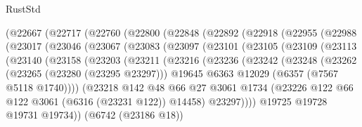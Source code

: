 \begin{lexlean}{RustStd}
\begin{coremodule}
    (@22667
      (@22717
        (@22760
          (@22800
            (@22848
              (@22892
                (@22918
                  (@22955
                    (@22988
                      (@23017
                        (@23046
                          (@23067
                            (@23083
                              (@23097
                                (@23101
                                  (@23105
                                    (@23109
                                      (@23113
                                        (@23140
                                          (@23158
                                            (@23203
                                              (@23211
                                                (@23216
                                                  (@23236
                                                    (@23242
                                                      (@23248
                                                        (@23262
                                                          (@23265 (@23280 (@23295 @23297)))
                                                          @19645
                                                          @6363
                                                          @12029
                                                          (@6357 (@7567 @5118 @1740))))
                                                      (@23218
                                                        @142
                                                        @48
                                                        @66
                                                        @27
                                                        @3061
                                                        @1734
                                                        (@23226
                                                          @122
                                                          @66
                                                          @122
                                                          @3061
                                                          (@6316 (@23231 @122))
                                                          @14458)
                                                        @23297))))
                                                @19725
                                                @19728
                                                @19731
                                                @19734))
                                            (@6742 (@23186 @18))

\end{coremodule}
\end{lexlean}
